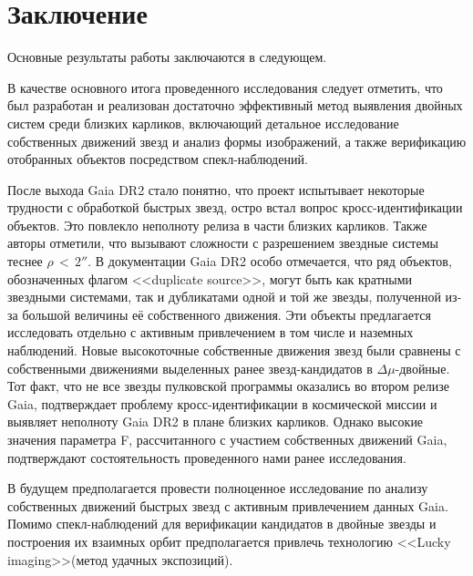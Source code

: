 \chapter*{Заключение}                       %


Основные результаты работы заключаются в следующем.

В качестве основного итога проведенного исследования следует отметить, что был разработан и реализован достаточно эффективный метод выявления двойных систем среди близких карликов, включающий детальное исследование собственных движений звезд и анализ формы изображений, а также верификацию отобранных объектов посредством спекл-наблюдений.

После выхода Gaia DR2 стало понятно, что проект испытывает некоторые трудности с обработкой быстрых звезд, остро встал вопрос кросс-идентификации объектов. Это повлекло неполноту релиза в части близких карликов. Также авторы отметили, что вызывают сложности с разрешением звездные системы теснее $\rho\,<\,2''$. В документации Gaia DR2 особо отмечается, что ряд объектов, обозначенных флагом <<duplicate source>>, могут быть как кратными звездными системами, так и дубликатами одной и той же звезды, полученной из-за большой величины её собственного движения. Эти объекты предлагается исследовать отдельно с активным привлечением в том числе и наземных наблюдений. Новые высокоточные собственные движения звезд были сравнены с собственными движениями выделенных ранее звезд-кандидатов в $\Delta\mu$-двойные. Тот факт, что не все звезды пулковской программы оказались во втором релизе Gaia, подтверждает проблему кросс-идентификации в космической миссии и выявляет неполноту Gaia DR2 в плане близких карликов. Однако высокие значения параметра F, рассчитанного с участием собственных движений Gaia, подтверждают состоятельность проведенного нами ранее исследования.

В будущем предполагается провести полноценное исследование по анализу собственных движений быстрых звезд с активным привлечением данных Gaia. Помимо спекл-наблюдений для верификации кандидатов в двойные звезды и построения их взаимных орбит предполагается привлечь технологию <<Lucky imaging>>(метод удачных экспозиций).

